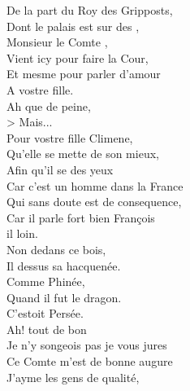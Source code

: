 \documentclass{article}
\begin{document}
\begin{ekddrama}
\begin{speech}
De la part du Roy des Gripposts,\\
Dont le palais est sur des ,\\
Monsieur le Comte ,\\
Vient icy pour faire la Cour,\\
Et mesme pour parler d'amour\\
A vostre fille.\\
Ah\app{\lem[wit=A]{!}\rdg[wit=B, alt=\emph{om.}]{}} que de peine,\\>
Mais...\\
Pour vostre fille Climene,\\
Qu'elle se mette de son mieux,\\
Afin qu'il se  des yeux\app{\lem[wit=A]{,}\rdg[wit=B, alt=\emph{om.}]{}}\\
Car c'est un homme dans la France\app{\lem[wit=A]{,}\rdg[wit=B, alt=\emph{om.}]{}}\\
Qui sans doute est de consequence,\\
Car il parle fort bien François\\
il loin.\\
Non dedans ce bois,\\
Il  dessus sa hacquenée.\\
Comme   Phinée,\\
Quand il fut  le dragon.\\
C’estoit Persée.\\
Ah! tout de bon\app{\lem[wit=A]{,}\rdg[wit=B, alt=\emph{om.}]{}}\\
Je n'y songeois pas\app{\lem[wit=A]{,}\rdg[wit=B, alt=\emph{om.}]{}} je vous jures\\
Ce Comte m'est de bonne augure\app{\lem[wit=A]{,}\rdg[wit=B, alt=\emph{om.}]{}}\\
J'ayme les gens de qualité,\\

\end{speech}
\end{ekddrama}
\end{document}
